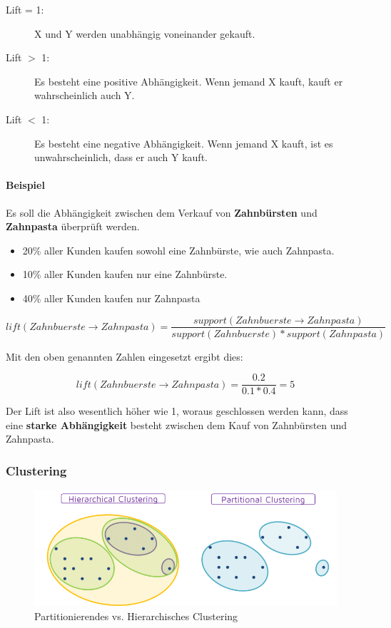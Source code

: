 \documentclass[a4paper, 11pt, nofootinbib]{article}
\begin{document}
\begin{description}
	\item[Lift = 1: ] X und Y werden unabhängig voneinander gekauft.
	\item[Lift $>$ 1: ] Es besteht eine positive Abhängigkeit. Wenn jemand X kauft, kauft er wahrscheinlich auch Y.
	\item[Lift $<$ 1: ] Es besteht eine negative Abhängigkeit. Wenn jemand X kauft, ist es unwahrscheinlich, dass er auch Y kauft.
\end{description}

\paragraph{Beispiel}
Es soll die Abhängigkeit zwischen dem Verkauf von \textbf{Zahnbürsten} und \textbf{Zahnpasta} überprüft werden.

\begin{itemize}
	\item 20\% aller Kunden kaufen sowohl eine Zahnbürste, wie auch Zahnpasta.
	\item 10\% aller Kunden kaufen nur eine Zahnbürste.
	\item 40\% aller Kunden kaufen nur Zahnpasta
\end{itemize}

\begin{equation}
lift(Zahnbuerste \rightarrow Zahnpasta) = \dfrac{support({Zahnbuerste \rightarrow Zahnpasta})}{support(Zahnbuerste) * support(Zahnpasta)}
\end{equation}

Mit den oben genannten Zahlen eingesetzt ergibt dies:

\begin{equation}
	lift(Zahnbuerste \rightarrow Zahnpasta) = \dfrac{0.2}{0.1 * 0.4} = 5
\end{equation}

Der Lift ist also wesentlich höher wie 1, woraus geschlossen werden kann, dass eine \textbf{starke Abhängigkeit} besteht zwischen dem Kauf von Zahnbürsten und Zahnpasta.
 
 \newpage
 
 \subsubsection{Clustering}
 
  \begin{figure}[htb]
 	\centering
 	\includegraphics[keepaspectratio=true,height=12\baselineskip]{clustering.png}
 	\caption{Partitionierendes vs. Hierarchisches Clustering}
 	\label{fig:Clustering}
 \end{figure}
 
\end{document}
